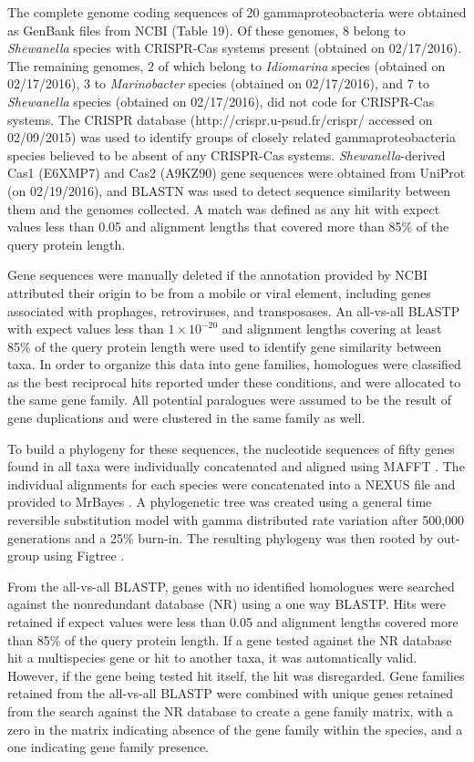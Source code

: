 \documentclass[english]{article}
\begin{document}
The complete genome coding sequences of 20 gammaproteobacteria
were obtained as GenBank files from NCBI (Table 19).  Of these
genomes, 8 belong to \textit{Shewanella} species with CRISPR-Cas systems
present (obtained  on 02/17/2016).  The  remaining  genomes, 2 of
which belong to \textit{Idiomarina}  species (obtained  on 02/17/2016), 3 to
\textit{Marinobacter}  species (obtained  on 02/17/2016), and 7 to 
\textit{Shewanella}
species (obtained  on 02/17/2016), did not code for CRISPR-Cas
systems.  The CRISPR database (http://crispr.u-psud.fr/crispr/
accessed on 02/09/2015) was used to identify groups of closely related
gammaproteobacteria species believed to be absent of any CRISPR-Cas
systems.  \textit{Shewanella}-derived Cas1 (E6XMP7) and  Cas2 (A9KZ90)  gene
sequences were obtained  from UniProt  (on 02/19/2016), and BLASTN was
used to detect sequence similarity between them and the genomes
collected. A match  was defined as any hit with expect values less
than  0.05 and alignment lengths that  covered more than  85\% of the
query protein  length.
 
Gene sequences were manually deleted if the annotation provided by NCBI
attributed their origin to be from a mobile or viral element,
including genes associated with prophages, retroviruses, and
transposases. An all-vs-all BLASTP with expect values less than $1\times10^{-20}$ and
alignment lengths covering at least 85\% of the query protein length
were used to identify gene similarity between taxa. In order to
organize this data into gene families, homologues were classified as the
best reciprocal hits reported under these conditions, and were
allocated to the same gene family. All potential paralogues were
assumed to be the result of gene duplications and were clustered in
the same family as well.   

To build a phylogeny for these sequences, the nucleotide sequences of fifty genes found in all taxa were
individually concatenated and aligned using MAFFT \citep{Kato:02}.
The individual alignments for each species were concatenated into a
NEXUS file and provided to MrBayes \citep{Ronq:03}. A
phylogenetic tree was created using a general time reversible
substitution model with gamma distributed rate variation after 500,000
generations and a 25\% burn-in. The resulting phylogeny was then
rooted by out-group using Figtree \citep{Rambaut:08}. 

From the all-vs-all BLASTP, genes with no identified homologues were
searched against the nonredundant database (NR) using a one way BLASTP. 
Hits were retained if
expect values were less than 0.05 and alignment lengths covered more
than 85\% of the query protein length. If a gene tested against the NR
database hit a
multispecies gene or hit to another taxa, it was automatically valid. However, if the gene
being tested hit itself, the hit was disregarded. 
Gene families retained from the all-vs-all BLASTP were
combined with unique genes retained from the search against the NR
database to create a gene family matrix, with a zero in the matrix
indicating absence of the gene family within the species, and a one indicating
gene family presence. 
\end{document}
